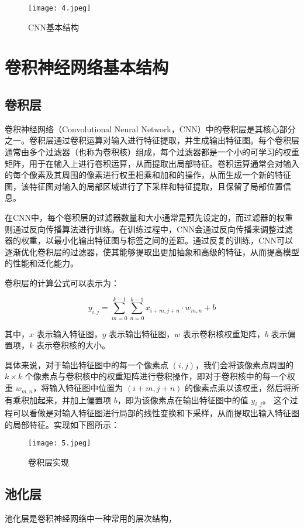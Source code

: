 \documentclass[AutoFakeBold]{LZUThesis}
\begin{document}
\begin{figure}[H]
    \centering
    \texttt{[image: 4.jpeg]}
    \caption{CNN基本结构}
    \label{figure}
 \end{figure}

\section{卷积神经网络基本结构}
\subsection{卷积层}

卷积神经网络（Convolutional Neural Network，CNN）中的卷积层是其核心部分之一。卷积层通过卷积运算对输入进行特征提取，并生成输出特征图。每个卷积层通常由多个过滤器（也称为卷积核）组成，每个过滤器都是一个小的可学习的权重矩阵，用于在输入上进行卷积运算，从而提取出局部特征。卷积运算通常会对输入的每个像素及其周围的像素进行权重相乘和加和的操作，从而生成一个新的特征图，该特征图对输入的局部区域进行了下采样和特征提取，且保留了局部位置信息。

在CNN中，每个卷积层的过滤器数量和大小通常是预先设定的，而过滤器的权重则通过反向传播算法进行训练。在训练过程中，CNN会通过反向传播来调整过滤器的权重，以最小化输出特征图与标签之间的差距。通过反复的训练，CNN可以逐渐优化卷积层的过滤器，使其能够提取出更加抽象和高级的特征，从而提高模型的性能和泛化能力。

卷积层的计算公式可以表示为：

$$
y_{i,j} = \sum_{m=0}^{k-1} \sum_{n=0}^{k-1} x_{i+m, j+n} \cdot w_{m, n} + b
$$

其中，$x$ 表示输入特征图，$y$ 表示输出特征图，$w$ 表示卷积核权重矩阵，$b$ 表示偏置项，$k$ 表示卷积核的大小。

具体来说，对于输出特征图中的每一个像素点 $(i,j)$，我们会将该像素点周围的 $k \times k$ 个像素点与卷积核中的权重矩阵进行卷积操作，即对于卷积核中的每一个权重 $w_{m,n}$，将输入特征图中位置为 $(i+m, j+n)$ 的像素点乘以该权重，然后将所有乘积加起来，并加上偏置项 $b$，即为该像素点在输出特征图中的值 $y_{i,j}$。
这个过程可以看做是对输入特征图进行局部的线性变换和下采样，从而提取出输入特征图的局部特征。实现如下图所示：

\begin{figure}[H]
    \centering
    \texttt{[image: 5.jpeg]}
    \caption{卷积层实现}
    \label{figure}
 \end{figure}

\subsection{池化层}
池化层是卷积神经网络中一种常用的层次结构，
\end{document}

